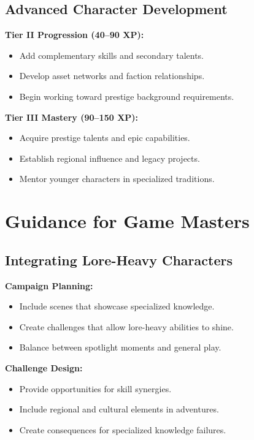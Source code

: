 \subsection{Advanced Character Development}
\label{subsec:advanced-development}

\textbf{Tier II Progression (40--90 XP):}
\begin{itemize}
\item Add complementary skills and secondary talents.
\item Develop asset networks and faction relationships.
\item Begin working toward prestige background requirements.
\end{itemize}

\textbf{Tier III Mastery (90--150 XP):}
\begin{itemize}
\item Acquire prestige talents and epic capabilities.
\item Establish regional influence and legacy projects.
\item Mentor younger characters in specialized traditions.
\end{itemize}

\section{Guidance for Game Masters}
\label{sec:gm-guidance}

\subsection{Integrating Lore-Heavy Characters}
\label{subsec:integration-guidance}

\textbf{Campaign Planning:}
\begin{itemize}
\item Include scenes that showcase specialized knowledge.
\item Create challenges that allow lore-heavy abilities to shine.
\item Balance between spotlight moments and general play.
\end{itemize}

\textbf{Challenge Design:}
\begin{itemize}
\item Provide opportunities for skill synergies.
\item Include regional and cultural elements in adventures.
\item Create consequences for specialized knowledge failures.
\end{itemize}

